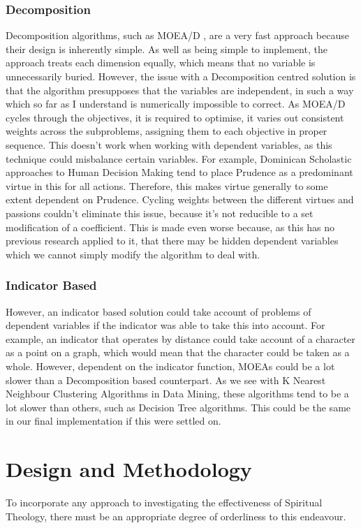 \documentclass[11pt]{article}
\begin{document}
\subsubsection{Decomposition}
Decomposition algorithms, such as MOEA/D \cite{MOEAD}, are a very fast approach because their design is inherently simple. As well as being simple to implement, the approach treats each dimension equally, which means that no variable is unnecessarily buried. However, the issue with a Decomposition centred solution is that the algorithm presupposes that the variables are independent, in such a way which so far as I understand is numerically impossible to correct. As MOEA/D cycles through the objectives, it is required to optimise, it varies out consistent weights across the subproblems, assigning them to each objective in proper sequence. This doesn't work when working with dependent variables, as this technique could misbalance certain variables. For example, Dominican Scholastic approaches to Human Decision Making tend to place Prudence as a predominant virtue in this for all actions. Therefore, this makes virtue generally to some extent dependent on Prudence. Cycling weights between the different virtues and passions couldn't eliminate this issue, because it's not reducible to a set modification of a coefficient. This is made even worse because, as this has no previous research applied to it, that there may be hidden dependent variables which we cannot simply modify the algorithm to deal with.  \\
\subsubsection{Indicator Based} 
However, an indicator based solution could take account of problems of dependent variables if the indicator was able to take this into account. For example, an indicator that operates by distance could take account of a character as a point on a graph, which would mean that the character could be taken as a whole. However, dependent on the indicator function, MOEAs could be a lot slower than a Decomposition based counterpart. As we see with K Nearest Neighbour Clustering Algorithms in Data Mining\cite{CompareML}, these algorithms tend to be a lot slower than others, such as Decision Tree algorithms. This could be the same in our final implementation if this were settled on. \\

\section{Design and Methodology}
To incorporate any approach to investigating the effectiveness of Spiritual Theology, there must be an appropriate degree of orderliness to this endeavour.
\end{document}
